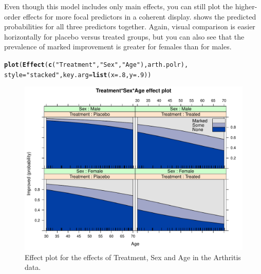 \documentclass[11pt]{book}\usepackage[]{graphicx}\usepackage[]{color}
\makeatletter
\newcommand{\hlnum}[1]{\textcolor[rgb]{0.686,0.059,0.569}{#1}}%
\newcommand{\hlstr}[1]{\textcolor[rgb]{0.192,0.494,0.8}{#1}}%
\newcommand{\hlstd}[1]{\textcolor[rgb]{0.345,0.345,0.345}{#1}}%
\newcommand{\hlkwc}[1]{\textcolor[rgb]{0.333,0.667,0.333}{#1}}%
\newcommand{\hlkwd}[1]{\textcolor[rgb]{0.737,0.353,0.396}{\textbf{#1}}}%
\newenvironment{kframe}{%
 \def\at@end@of@kframe{}%
 \ifinner\ifhmode%
  \def\at@end@of@kframe{\end{minipage}}%
  \begin{minipage}{\columnwidth}%
 \fi\fi%
 \def\FrameCommand##1{\hskip\@totalleftmargin \hskip-\fboxsep
 \colorbox{shadecolor}{##1}\hskip-\fboxsep
     \hskip-\linewidth \hskip-\@totalleftmargin \hskip\columnwidth}%
 \MakeFramed {\advance\hsize-\width
   \@totalleftmargin\z@ \linewidth\hsize
   \@setminipage}}%
 {\par\unskip\endMakeFramed%
 \at@end@of@kframe}
\newenvironment{knitrout}{}{} %
\renewenvironment{knitrout}{\small\renewcommand{\baselinestretch}{.85}}{} %
\makeatother
\begin{document}
Even though this model includes only main effects, you can still plot the higher-order effects
for more focal predictors in a coherent display.   shows
the predicted probabilities for all three predictors together. Again, visual comparison is easier
horizontally for placebo versus treated groups, but you can also see that the prevalence of
marked improvement is greater for females than for males.
\begin{knitrout}
\color{fgcolor}\begin{kframe}
\begin{alltt}
\hlkwd{plot}\hlstd{(}\hlkwd{Effect}\hlstd{(}\hlkwd{c}\hlstd{(}\hlstr{"Treatment"}\hlstd{,} \hlstr{"Sex"}\hlstd{,} \hlstr{"Age"}\hlstd{), arth.polr),}
     \hlkwc{style}\hlstd{=}\hlstr{"stacked"}\hlstd{,} \hlkwc{key.arg}\hlstd{=}\hlkwd{list}\hlstd{(}\hlkwc{x}\hlstd{=}\hlnum{.8}\hlstd{,} \hlkwc{y}\hlstd{=}\hlnum{.9}\hlstd{))}
\end{alltt}
\end{kframe}\begin{figure}[!htbp]


\centerline{\includegraphics[width=.9\textwidth]{ch07/fig/arth-po-eff2-1} }

\caption[Effect plot for the effects of Treatment, Sex and Age in the Arthritis data]{Effect plot for the effects of Treatment, Sex and Age in the Arthritis data.\label{fig:arth-po-eff2}}
\end{figure}


\end{knitrout}
\end{document}
